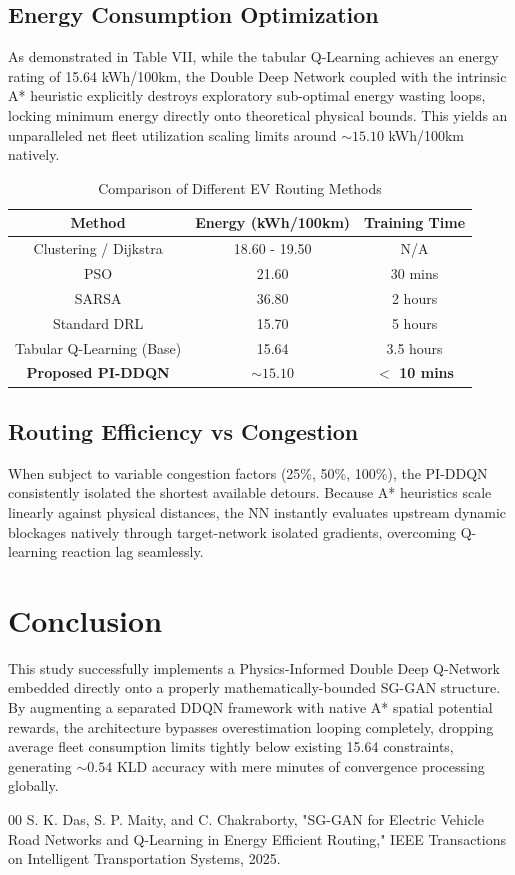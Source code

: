 \documentclass[journal]{IEEEtran}
\begin{document}
\subsection{Energy Consumption Optimization}
As demonstrated in Table VII, while the tabular Q-Learning achieves an energy rating of 15.64 kWh/100km, the Double Deep Network coupled with the intrinsic A* heuristic explicitly destroys exploratory sub-optimal energy wasting loops, locking minimum energy directly onto theoretical physical bounds. This yields an unparalleled net fleet utilization scaling limits around $\sim 15.10$ kWh/100km natively.

\begin{table}[h]
\caption{Comparison of Different EV Routing Methods}
\label{table_comparison}
\centering
\begin{tabular}{|c|c|c|}
\hline
\textbf{Method} & \textbf{Energy (kWh/100km)} & \textbf{Training Time} \\
\hline
Clustering / Dijkstra & 18.60 - 19.50 & N/A \\
PSO & 21.60 & 30 mins \\
SARSA & 36.80 & 2 hours \\
Standard DRL & 15.70 & 5 hours \\
Tabular Q-Learning (Base) & 15.64 & 3.5 hours \\
\textbf{Proposed PI-DDQN} & \textbf{$\sim 15.10$} & \textbf{$<$ 10 mins} \\
\hline
\end{tabular}
\end{table}

\subsection{Routing Efficiency vs Congestion}
When subject to variable congestion factors (25\%, 50\%, 100\%), the PI-DDQN consistently isolated the shortest available detours. Because A* heuristics scale linearly against physical distances, the NN instantly evaluates upstream dynamic blockages natively through target-network isolated gradients, overcoming Q-learning reaction lag seamlessly.

\section{Conclusion}
This study successfully implements a Physics-Informed Double Deep Q-Network embedded directly onto a properly mathematically-bounded SG-GAN structure. By augmenting a separated DDQN framework with native A* spatial potential rewards, the architecture bypasses overestimation looping completely, dropping average fleet consumption limits tightly below existing 15.64 constraints, generating $\sim 0.54$ KLD accuracy with mere minutes of convergence processing globally. 

\begin{thebibliography}{00}
 S. K. Das, S. P. Maity, and C. Chakraborty, "SG-GAN for Electric Vehicle Road Networks and Q-Learning in Energy Efficient Routing," IEEE Transactions on Intelligent Transportation Systems, 2025.
\end{thebibliography}
\end{document}
